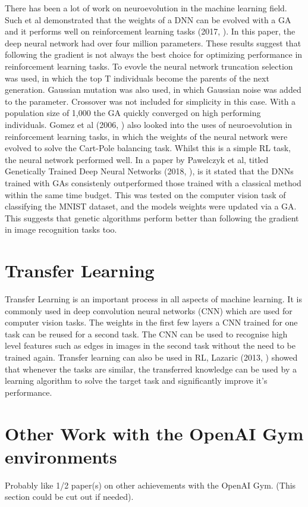 There has been a lot of work on neuroevolution in the machine learning field. Such et al demonstrated that the weights of a DNN can be evolved with a GA and it performs well on reinforcement learning tasks (2017, \cite{such}). In this paper, the deep neural network had over four million parameters. These results suggest that following the gradient is not always the best choice for optimizing performance in reinforcement learning tasks. To evovle the neural network truncation selection was used, in which the top T individuals become the parents of the next generation. Gaussian mutation was also used, in which Gaussian noise was added to the parameter. Crossover was not included for simplicity in this case. With a population size of 1,000 the GA quickly converged on high performing individuals. Gomez et al (2006, \cite{gomez}) also looked into the uses of neuroevolution in reinforcement learning tasks, in which the weights of the neural network were evolved to solve the Cart-Pole balancing task. Whilst this is a simple RL task, the neural network performed well. In a paper by Pawelczyk et al, titled Genetically Trained Deep Neural Networks (2018, \cite{pawelczyk}), is it stated that the DNNs trained with GAs consistenly outperformed those trained with a classical method within the same time budget. This was tested on the computer vision task of classifying the MNIST dataset, and the models weights were updated via a GA. This suggests that genetic algorithms perform better than following the gradient in image recognition tasks too.

\section{Transfer Learning}

Transfer Learning is an important process in all aspects of machine learning. It is commonly used in deep convolution neural networks (CNN) which are used for computer vision tasks. The weights in the first few layers a CNN trained for one task can be reused for a second task. The CNN can be used to recognise high level features such as edges in images in the second task without the need to be trained again. Transfer learning can also be used in RL, Lazaric (2013, \cite{lazaric}) showed that whenever the tasks are similar, the transferred knowledge can be used by a learning algorithm to solve the target task and significantly improve it's performance. 

\section{Other Work with the OpenAI Gym environments}

Probably like 1/2 paper(s) on other achievements with the OpenAI Gym. (This section could be cut out if needed).
